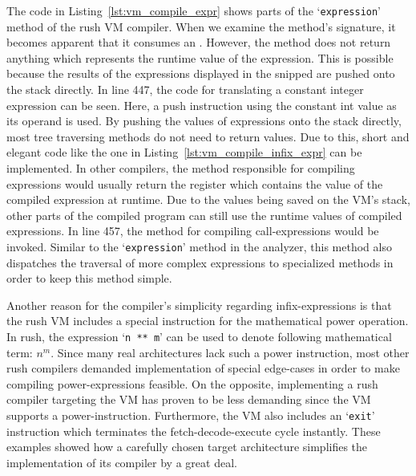 The code in Listing~\ref{lst:vm_compile_expr} shows parts of the `\texttt{expression}' method of the rush VM compiler.
When we examine the method's signature, it becomes apparent that it consumes an .
However, the method does not return anything which represents the runtime value of the expression.
This is possible because the results of the expressions displayed in the snipped are pushed onto the stack directly.
In line 447, the code for translating a constant integer expression can be seen.
Here, a push instruction using the constant int value as its operand is used.
By pushing the values of expressions onto the stack directly, most tree traversing methods do not need to return values.
Due to this, short and elegant code like the one in Listing~\ref{lst:vm_compile_infix_expr} can be implemented.
In other compilers, the method responsible for compiling expressions would usually return the register which contains the value of the compiled expression at runtime.
Due to the values being saved on the VM's stack, other parts of the compiled program can still use the runtime values of compiled expressions.
In line 457, the method for compiling call-expressions would be invoked.
Similar to the `\texttt{expression}' method in the analyzer, this method also dispatches the traversal of more complex expressions to specialized methods in order to keep this method simple.

Another reason for the compiler's simplicity regarding infix-expressions is that the rush VM includes a special instruction for the mathematical power operation.
In rush, the expression `\texttt{n ** m}' can be used to denote following mathematical term: $n^m$.
Since many real architectures lack such a power instruction, most other rush compilers demanded implementation of special edge-cases in order to make compiling power-expressions feasible.
On the opposite, implementing a rush compiler targeting the VM has proven to be less demanding since the VM supports a power-instruction.
Furthermore, the VM also includes an `\texttt{exit}' instruction which terminates the fetch-decode-execute cycle instantly.
These examples showed how a carefully chosen target architecture simplifies the implementation of its compiler by a great deal.

